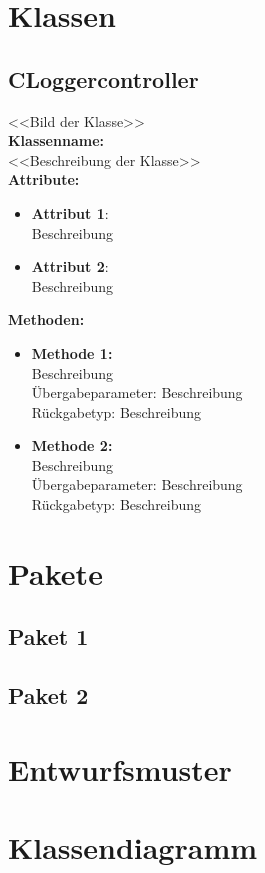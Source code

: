 \section{Klassen}
\subsection{CLoggercontroller}
<<Bild der Klasse>>
\\\textbf{Klassenname:}
\\<<Beschreibung der Klasse>>
\\\textbf{Attribute:}
\begin{itemize}
\item \textbf{Attribut 1}:
\\Beschreibung
\item \textbf{Attribut 2}:
\\Beschreibung
\end{itemize}
\textbf{Methoden:}
\begin{itemize}
\item \textbf{Methode 1:} 
\\Beschreibung 
\\Übergabeparameter: Beschreibung
\\Rückgabetyp: Beschreibung
\item \textbf{Methode 2:} 
\\Beschreibung 
\\Übergabeparameter: Beschreibung
\\Rückgabetyp: Beschreibung
\end{itemize}
\section{Pakete}
\subsection{Paket 1}
\subsection{Paket 2}
\section{Entwurfsmuster}

\section{Klassendiagramm}

